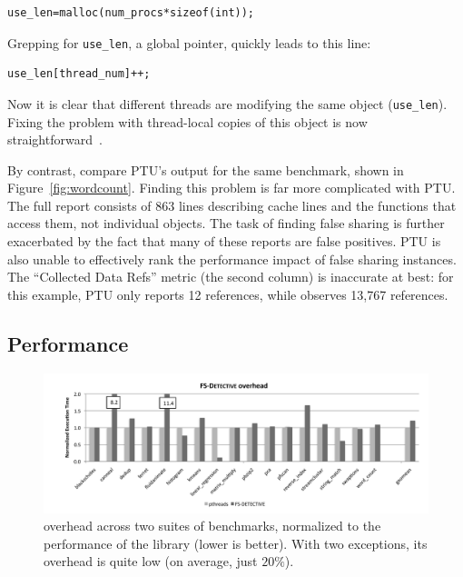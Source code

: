 \begin{verbatim}
use_len=malloc(num_procs*sizeof(int));
\end{verbatim}

\noindent
Grepping for \texttt{use\_len}, a global pointer, quickly leads to this line:

\begin{verbatim}
use_len[thread_num]++;
\end{verbatim}

Now it is clear that different threads are modifying the same object
(\texttt{use\_len}). Fixing the problem with 
thread-local copies of this object is now straightforward~\cite{detect:intel}.

By contrast, compare PTU's output for the same benchmark, shown in
Figure~\ref{fig:wordcount}.  Finding this problem is far more
complicated with PTU. The full report consists of 863 lines
describing cache lines and the functions that access them, not
individual objects. The task of finding false sharing is further
exacerbated by the fact that many of these reports are false
positives. PTU is also unable to effectively rank the performance
impact of false sharing instances. The ``Collected Data Refs'' metric
(the second column) is inaccurate at best: for this example, PTU only
reports 12 references, while \sheriffdetect{} observes 13,767
references.


\subsection{ \sheriffdetect{} Performance}
\label{sec:results-detective-overhead}

\begin{figure}[!t]
\centering
\includegraphics[width=6in]{figure/detectiveperf}
\caption{\sheriffdetect{} overhead across two suites of benchmarks,
  normalized to the performance of the \pthreads{} library (lower is better). 
  With two exceptions, its overhead is quite low (on average, just $20\%$).
\label{fig:overhead}}
\end{figure}



